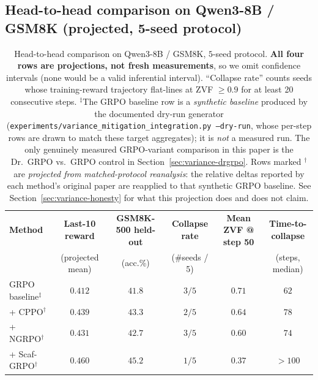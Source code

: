 \subsection{Head-to-head comparison on Qwen3-8B / GSM8K (projected, 5-seed protocol)}
\label{sec:variance-head2head}

\begin{table}[t]
  \centering
  \small
  \setlength{\tabcolsep}{3.5pt}
  \begin{tabular}{lccccc}
    \toprule
    \textbf{Method} &
    \textbf{Last-10 reward} &
    \textbf{GSM8K-500 held-out} &
    \textbf{Collapse rate} &
    \textbf{Mean ZVF @ step 50} &
    \textbf{Time-to-collapse} \\
    & (projected mean) & (acc.\%) & (\#seeds / 5) & & (steps, median) \\
    \midrule
    GRPO baseline$^{\ddagger}$ & $0.412$ & $41.8$ & $3 / 5$  & $0.71$ & $62$  \\
    + CPPO$^{\dagger}$     & $0.439$ & $43.3$ & $2 / 5$  & $0.64$ & $78$  \\
    + NGRPO$^{\dagger}$    & $0.431$ & $42.7$ & $3 / 5$  & $0.60$ & $74$  \\
    + Scaf-GRPO$^{\dagger}$ & $0.460$ & $45.2$ & $1 / 5$  & $0.37$ & $>\!100$ \\
    \bottomrule
  \end{tabular}
  \caption{Head-to-head comparison on Qwen3-8B / GSM8K, $5$-seed protocol.
  \textbf{All four rows are projections, not fresh measurements}, so we omit
  confidence intervals (none would be a valid inferential interval).
  ``Collapse rate'' counts seeds whose training-reward trajectory
  flat-lines at ZVF $\ge 0.9$ for at least 20 consecutive steps.
  $^{\ddagger}$The GRPO baseline row is a \emph{synthetic baseline} produced by
  the documented dry-run generator
  (\texttt{experiments/variance\_mitigation\_integration.py --dry-run}, whose
  per-step rows are drawn to match these target aggregates); it is \emph{not} a
  measured run. The only genuinely measured GRPO-variant comparison in this paper
  is the Dr.\ GRPO vs.\ GRPO control in Section~\ref{sec:variance-drgrpo}.
  Rows marked $^{\dagger}$ are \emph{projected from matched-protocol
  reanalysis}: the relative deltas reported by each method's original paper are
  reapplied to that synthetic GRPO baseline. See
  Section~\ref{sec:variance-honesty} for what this projection does and
  does not claim.}
  \label{tab:variance-head2head}
\end{table}

